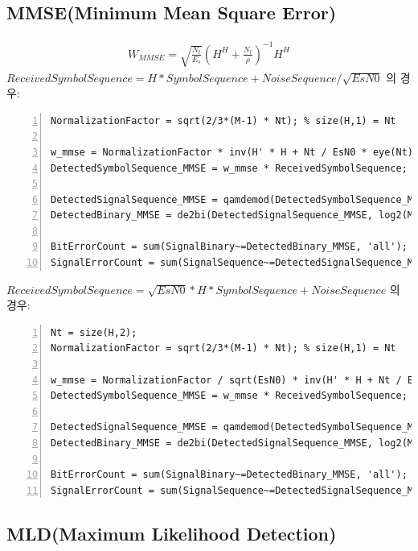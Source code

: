 \documentclass{article}
\begin{document}
\subsection{MMSE(Minimum Mean Square Error)}
\begin{gather}
	W_{MMSE}=\sqrt{\frac{N_t}{E_s}}(H^H+\frac{N_t}{\rho})^{-1}H^H
\end{gather}
$ReceivedSymbolSequence = H * SymbolSequence + NoiseSequence / \sqrt{EsN0}$ 의 경우:
\begin{lstlisting}[style=Matlab-editor, frame=single, numbers=left,]
NormalizationFactor = sqrt(2/3*(M-1) * Nt); % size(H,1) = Nt

w_mmse = NormalizationFactor * inv(H' * H + Nt / EsN0 * eye(Nt)) * H';
DetectedSymbolSequence_MMSE = w_mmse * ReceivedSymbolSequence;

DetectedSignalSequence_MMSE = qamdemod(DetectedSymbolSequence_MMSE, M);
DetectedBinary_MMSE = de2bi(DetectedSignalSequence_MMSE, log2(M), 'left-msb');

BitErrorCount = sum(SignalBinary~=DetectedBinary_MMSE, 'all');
SignalErrorCount = sum(SignalSequence~=DetectedSignalSequence_MMSE, 'all');
\end{lstlisting}
\vspace{0.5cm}
$ReceivedSymbolSequence = \sqrt{EsN0} * H * SymbolSequence + NoiseSequence$ 의 경우:
\begin{lstlisting}[style=Matlab-editor, frame=single, numbers=left,]
Nt = size(H,2);
NormalizationFactor = sqrt(2/3*(M-1) * Nt); % size(H,1) = Nt

w_mmse = NormalizationFactor / sqrt(EsN0) * inv(H' * H + Nt / EsN0 * eye(Nt)) * H';
DetectedSymbolSequence_MMSE = w_mmse * ReceivedSymbolSequence; % Detection (Zero-Forcing: y / h)

DetectedSignalSequence_MMSE = qamdemod(DetectedSymbolSequence_MMSE, M); % Detection
DetectedBinary_MMSE = de2bi(DetectedSignalSequence_MMSE, log2(M), 'left-msb');

BitErrorCount = sum(SignalBinary~=DetectedBinary_MMSE, 'all');
SignalErrorCount = sum(SignalSequence~=DetectedSignalSequence_MMSE, 'all');
\end{lstlisting}
\subsection{MLD(Maximum Likelihood Detection)}
\end{document}
